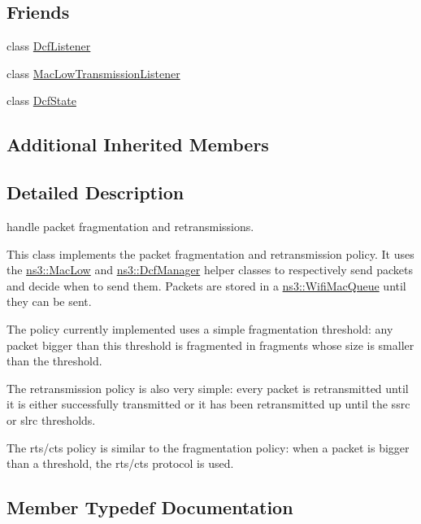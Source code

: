 \subsection*{Friends}
\begin{DoxyCompactItemize}
\item 
class \hyperlink{classns3_1_1DcaTxop_a0dbe0f6675c16b2568ac5560de5b993a}{Dcf\+Listener}
\item 
class \hyperlink{classns3_1_1DcaTxop_acb0a74bf9ad91e525744779eda328365}{Mac\+Low\+Transmission\+Listener}
\item 
class \hyperlink{classns3_1_1DcaTxop_a709d6e7063c67126c6931ecc0c9a3617}{Dcf\+State}
\end{DoxyCompactItemize}
\subsection*{Additional Inherited Members}


\subsection{Detailed Description}
handle packet fragmentation and retransmissions.

This class implements the packet fragmentation and retransmission policy. It uses the \hyperlink{classns3_1_1MacLow}{ns3\+::\+Mac\+Low} and \hyperlink{classns3_1_1DcfManager}{ns3\+::\+Dcf\+Manager} helper classes to respectively send packets and decide when to send them. Packets are stored in a \hyperlink{namespacens3_a3ca96bcdf02c0e7cacea08ca62ead54c}{ns3\+::\+Wifi\+Mac\+Queue} until they can be sent. 

The policy currently implemented uses a simple fragmentation threshold\+: any packet bigger than this threshold is fragmented in fragments whose size is smaller than the threshold.

The retransmission policy is also very simple\+: every packet is retransmitted until it is either successfully transmitted or it has been retransmitted up until the ssrc or slrc thresholds.

The rts/cts policy is similar to the fragmentation policy\+: when a packet is bigger than a threshold, the rts/cts protocol is used. 

\subsection{Member Typedef Documentation}
